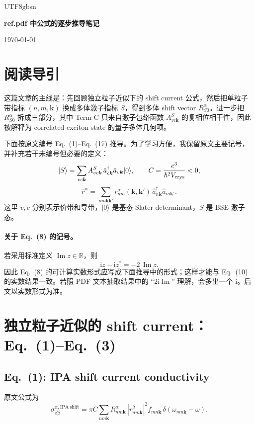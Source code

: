 \documentclass[11pt,a4paper]{article}
\newcommand{\ii}{\mathrm{i}}
\newcommand{\Impart}{\operatorname{Im}}
\begin{document}
\ifPDFTeX
\begin{CJK}{UTF8}{gbsn}
\fi

\begin{center}
{\LARGE\bfseries ref.pdf 中公式的逐步推导笔记\par}
\vspace{0.8em}
{\today\par}
\end{center}
\vspace{1em}

\section*{阅读导引}

这篇文章的主线是：先回顾独立粒子近似下的 shift current 公式，然后把单粒子带指标
$(n,m,\bm k)$ 换成多体激子指标 $S$，得到多体 shift vector
$R^\alpha_{S0}$。进一步把 $R^\alpha_{S0}$ 拆成三部分，其中 Term C 只来自激子包络函数
$A^S_{vc\bm k}$ 的复相位相干性，因此被解释为 correlated exciton state 的量子多体几何项。

下面按原文编号 Eq.~(1)--Eq.~(17) 推导。为了学习方便，我保留原文主要记号，并补充若干未编号但必要的定义：
\[
|S\rangle=\sum_{vc\bm k}A^S_{vc\bm k}\,
\hat a^\dagger_{c\bm k}\hat a_{v\bm k}|0\rangle,\qquad
C=\frac{e^3}{\hbar^2V_{\rm crys}}<0,
\]
\[
\hat r^\alpha=\sum_{nm\bm k\bm k'}
r^\alpha_{nm}(\bm k,\bm k')\,
\hat a^\dagger_{n\bm k}\hat a_{m\bm k'} .
\]
这里 $v,c$ 分别表示价带和导带，$|0\rangle$ 是基态 Slater determinant，$S$ 是 BSE 激子态。

\paragraph{关于 Eq.~(8) 的记号。}
若采用标准定义 $\Impart z\in\mathbb R$，则
\[
\ii z-\ii z^*=-2\,\Impart z.
\]
因此 Eq.~(8) 的可计算实数形式应写成下面推导中的形式；这样才能与 Eq.~(10) 的实数结果一致。若照 PDF 文本抽取结果中的 ``$2\ii\Impart$'' 理解，会多出一个 $\ii$。后文以实数形式为准。

\section{独立粒子近似的 shift current：Eq.~(1)--Eq.~(3)}

\subsection*{Eq.~(1): IPA shift current conductivity}

原文公式为
\begin{equation}
\sigma^{\alpha,\mathrm{IPA\ shift}}_{\beta\beta}
=\pi C\sum_{nm\bm k}
R^\alpha_{nm\bm k}\,
\left|r^\beta_{nm\bm k}\right|^2
f_{mn\bm k}\,
\delta(\omega_{mn\bm k}-\omega).
\tag{1}
\end{equation}


\end{CJK}
\end{document}
